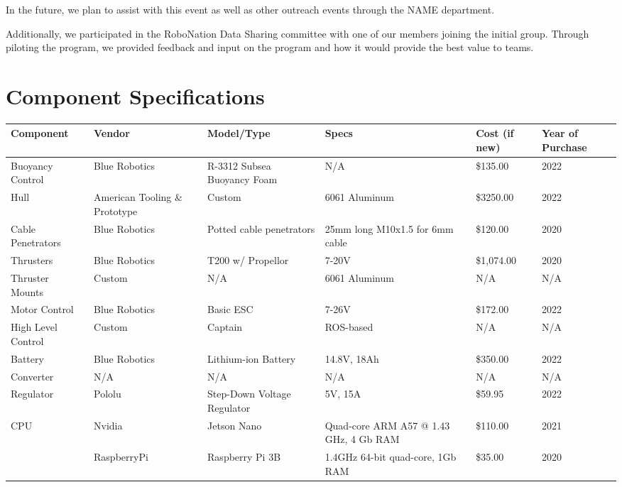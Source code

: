\documentclass[conference]{IEEEtran}
\begin{document}
In the future, we plan to assist with this event as well as other outreach events through the NAME department.

Additionally, we participated in the RoboNation Data Sharing committee with one of our members joining the initial group. Through piloting the program, we provided feedback and input on the program and how it would provide the best value to teams.


\clearpage
\section{Component Specifications}
\begin{table}[htbp]
\begin{center}
\begin{tabularx}{\textwidth}{|X|X|X|X|X|X|}
    \hline
        Component & Vendor & Model/Type & Specs & Cost (if new) & Year of Purchase \\ \hline
        Buoyancy Control & Blue Robotics & R-3312 Subsea Buoyancy Foam & N/A & \$135.00 & 2022 \\ \hline
        Hull  & American Tooling \& Prototype & Custom & 6061 Aluminum & \$3250.00 & 2022 \\ \hline
        Cable Penetrators & Blue Robotics & Potted cable penetrators & 25mm long M10x1.5 for 6mm cable & \$120.00 & 2020 \\ \hline
        Thrusters  & Blue Robotics & T200 w/ Propellor & 7-20V & \$1,074.00  & 2020\\ \hline
        Thruster Mounts  & Custom & N/A & 6061 Aluminum & N/A & N/A \\ \hline
        Motor Control  & Blue Robotics & Basic ESC & 7-26V & \$172.00  & 2022 \\ \hline
        High Level Control  & Custom & Captain & ROS-based & N/A & N/A \\ \hline
        Battery  & Blue Robotics & Lithium-ion Battery & 14.8V, 18Ah & \$350.00  & 2022 \\ \hline
        Converter  & N/A & N/A & N/A & N/A & N/A \\ \hline
        Regulator & Pololu & Step-Down Voltage Regulator & 5V, 15A & \$59.95 & 2022 \\ \hline
        CPU & Nvidia & Jetson Nano & Quad-core ARM A57 @ 1.43 GHz, 4 Gb RAM & \$110.00  & 2021 \\ \hline
        ~ & RaspberryPi & Raspberry Pi 3B & 1.4GHz 64-bit quad-core, 1Gb RAM & \$35.00  & 2020 \\ \hline

\end{tabularx}
\end{center}
\end{table}
\end{document}
